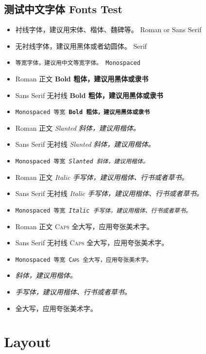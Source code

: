 \documentclass[
        handout,
        ]{beamer}
\begin{document}
\subsection{测试中文字体 Fonts Test}
\begin{frame}[allowframebreaks]{\subsecname} %
    \begin{itemize}
    \item \textrm{衬线字体，建议用宋体、楷体、魏碑等。	Roman or Sans Serif}
    \item \textsf{无衬线字体，建议用黑体或者幼圆体。	Serif}
    \item \texttt{等宽字体，建议用中文等宽字体。		Monospaced}
    \item \textrm{Roman 	 正文   \textbf{Bold 粗体，建议用黑体或隶书}}
    \item \textsf{Sans Serif 无衬线 \textbf{Bold 粗体，建议用黑体或隶书}}
    \item \texttt{Monospaced 等宽   \textbf{Bold 粗体，建议用黑体或隶书}}
    \item \textrm{Roman 	 正文   \textsl{Slanted 斜体，建议用楷体。}}
    \item \textsf{Sans Serif 无衬线 \textsl{Slanted 斜体，建议用楷体。}}
    \item \texttt{Monospaced 等宽   \textsl{Slanted 斜体，建议用楷体。}}
    \item \textrm{Roman 	 正文   \textit{Italic 手写体，建议用楷体、行书或者草书。}}
    \item \textsf{Sans Serif 无衬线 \textit{Italic 手写体，建议用楷体、行书或者草书。}}
    \item \texttt{Monospaced 等宽   \textit{Italic 手写体，建议用楷体、行书或者草书。}}
    \item \textrm{Roman 	 正文   \textsc{Caps 全大写，应用夸张美术字。}}
    \item \textsf{Sans Serif 无衬线 \textsc{Caps 全大写，应用夸张美术字。}}
    \item \texttt{Monospaced 等宽   \textsc{Caps 全大写，应用夸张美术字。}}
    \item \textsl{斜体，建议用楷体。}
    \item \textit{手写体，建议用楷体、行书或者草书。}
    \item \textsc{全大写，应用夸张美术字。}
    \end{itemize}
\end{frame}


\section{Layout}
\end{document}
